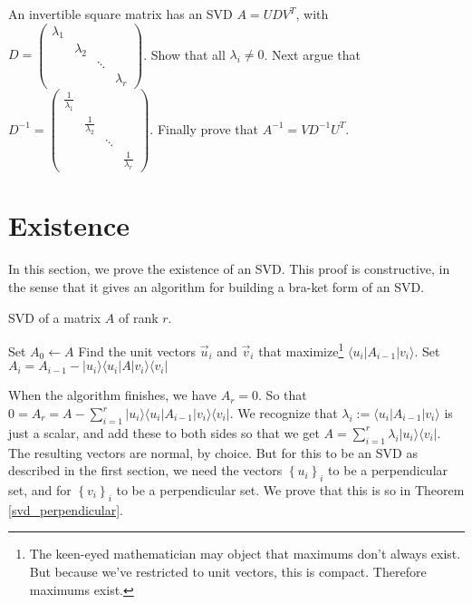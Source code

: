 \documentclass{amsbook}
\begin{document}
\item An invertible square matrix has an SVD $A=UDV^T$, with $D=\left(\begin{array}{cccc}\lambda_1&&&\\&\lambda_2&&\\&&\ddots&\\&&&\lambda_r\end{array}\right)$.  Show that all $\lambda_i\neq0$.  Next argue that $D^{-1}=\left(\begin{array}{cccc}\frac{1}{\lambda_1}&&&\\&\frac{1}{\lambda_2}&&\\&&\ddots&\\&&&\frac{1}{\lambda_r}\end{array}\right)$.  Finally prove that $A^{-1}=VD^{-1}U^T$.

\section{Existence}

In this section, we prove the existence of an SVD.  This proof is constructive, in the sense that it gives an algorithm for building a bra-ket form of an SVD.

\begin{algorithm}
\caption{SVD of a matrix $A$ of rank $r$.}
\label{alg1}
\begin{algorithmic}
\State Set $A_0 \gets A$
	\State Find the unit vectors $\vec u _i$ and $\vec v _i$ that maximize\footnote{The keen-eyed mathematician may object that maximums don't always exist.  But because we've restricted to unit vectors, this is compact.  Therefore maximums exist.} $\langle u _i|A_{i-1}| v _i\rangle$.
	\State Set $A_i = A_{i-1}-| u _i\rangle\langle u _i|A| v _i\rangle\langle v _i|$
\EndWhile
\end{algorithmic}
\end{algorithm}

When the algorithm finishes, we have $A_r=0$.  So that $0=A_r=A-\sum_{i=1}^r| u _i\rangle\langle u _i|A_{i-1}| v _i\rangle\langle v _i|$.  We recognize that $\lambda_i:=\langle u _i|A_{i-1}| v _i\rangle$ is just a scalar, and add these to both sides so that we get $A=\sum_{i=1}^r\lambda_i| u _i\rangle\langle v _i|$.  The resulting vectors are normal, by choice.  But for this to be an SVD as described in the first section, we need the vectors $\left\{u_i\right\}_i$ to be a perpendicular set, and for $\left\{v_i\right\}_i$ to be a perpendicular set.  We prove that this is so in Theorem \ref{svd_perpendicular}.
\end{document}
